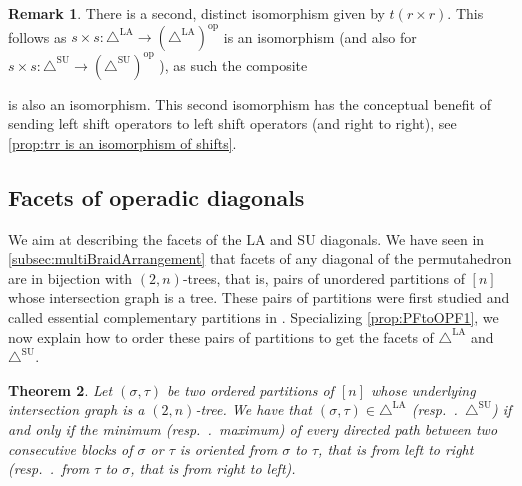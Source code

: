 \documentclass{amsart}
\newtheorem{theorem}{Theorem}[section]
\theoremstyle{definition}
\newtheorem{remark}[theorem]{Remark}
\newcommand{\resp}{\textit{resp.}~} %
\newcommand{\SU}{\mathrm{SU}}
\newcommand{\LA}{\mathrm{LA}}
\newcommand{\SUD}{\triangle^{\mathrm{SU}}}
\newcommand{\LAD}{\triangle^{\mathrm{LA}}}
\newcommand{\op}{\mathrm{op}}
\begin{document}
\begin{remark} \label{rem:Alternate Isomorphism}
There is a second, distinct isomorphism given by $t(r\times r)$.
This follows as $s\times s:\LAD \to (\LAD)^{\op}$ is an isomorphism (and also for  $s\times s:\SUD \to (\SUD)^{\op}$ ), as such the composite 
\begin{center}
\end{center}
is also an isomorphism.
This second isomorphism has the conceptual benefit of sending left shift operators to left shift operators (and right to right), see \cref{prop:trr is an isomorphism of shifts}.
\end{remark}


\subsection{Facets of operadic diagonals}
\label{subsec:facets-operadic-diags}

We aim at describing the facets of the $\LA$ and $\SU$ diagonals. 
We have seen in \cref{subsec:multiBraidArrangement} that facets of any diagonal of the permutahedron are in bijection with $(2,n)$-trees, that is, pairs of unordered partitions of $[n]$ whose intersection graph is a tree.
These pairs of partitions were first studied and called essential complementary partitions in \cite{chen1969computer,chen1971tables,kajitani1982number}.
Specializing \cref{prop:PFtoOPF1}, we now explain how to order these pairs of partitions to get the facets of $\LAD$ and $\SUD$. 

\begin{theorem}
\label{thm:facet-ordering}
Let $(\sigma,\tau)$ be two ordered partitions of $[n]$ whose underlying intersection graph is a $(2,n)$-tree.
We have that $(\sigma,\tau) \in \LAD$ (\resp.~$\SUD$) if and only if the minimum (\resp.~maximum) of every directed path between two consecutive blocks of $\sigma$ or $\tau$ is oriented from $\sigma$ to $\tau$, that is from left to right (\resp.~from $\tau$ to $\sigma$, that is from right to left).
\end{theorem}
\end{document}

